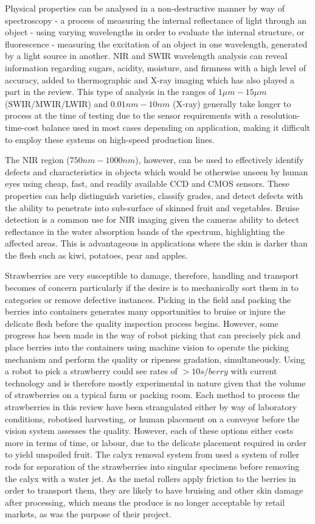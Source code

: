 \documentclass[fleqn,twoside,12pt]{report}
\begin{document}
Physical properties can be analysed in a non-destructive manner by way of spectroscopy - a process of measuring the internal reflectance of light through an object - using varying wavelengths in order to evaluate the internal structure, or fluorescence - measuring the excitation of an object in one wavelength, generated by a light source in another. NIR and SWIR wavelength analysis can reveal information regarding sugars, acidity, moisture, and firmness with a high level of accuracy, added to thermographic and X-ray imaging which has also played a part in the review. This type of analysis in the ranges of $1\mu m-15\mu m$ (SWIR/MWIR/LWIR) and $0.01nm-10nm$ (X-ray) generally take longer to process at the time of testing due to the sensor requirements with a resolution-time-cost balance used in most cases depending on application, making it difficult to employ these systems on high-speed production lines.  

The NIR region ($750nm-1000nm$), however, can be used to effectively identify defects and characteristics in objects which would be otherwise unseen by human eyes using cheap, fast, and readily available CCD and CMOS sensors. These properties can help distinguish varieties, classify grades, and detect defects with the ability to penetrate into sub-surface of skinned fruit and vegetables. Bruise detection is a common use for NIR imaging given the cameras ability to detect reflectance in the water absorption bands of the spectrum, highlighting the affected areas. This is advantageous in applications where the skin is darker than the flesh such as kiwi, potatoes, pear and apples.

Strawberries are very susceptible to damage, therefore, handling and transport becomes of concern particularly if the desire is to mechanically sort them in to categories or remove defective instances. Picking in the field and packing the berries into containers generates many opportunities to bruise or injure the delicate flesh before the quality inspection process begins. However, some progress has been made in the way of robot picking that can precisely pick and place berries into the containers using machine vision to operate the picking mechanism and perform the quality or ripeness gradation, simultaneously. Using a robot to pick a strawberry could see rates of $>10s/berry$ with current technology and is therefore mostly experimental in nature given that the volume of strawberries on a typical farm or packing room. Each method to process the strawberries in this review have been strangulated either by way of laboratory conditions, robotised harvesting, or human placement on a conveyor before the vision system assesses the quality. However, each of these options either costs more in terms of time, or labour, due to the delicate placement required in order to yield unspoiled fruit. The calyx removal system from \cite{lin} used a system of roller rods for separation of the strawberries into singular specimens before removing the calyx with a water jet. As the metal rollers apply friction to the berries in order to transport them, they are likely to have bruising and other skin damage after processing, which means the produce is no longer acceptable by retail markets, as was the purpose of their project. 
\end{document}
